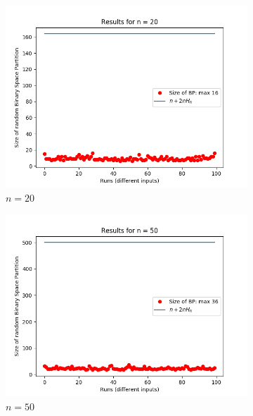 \documentclass[letterpaper]{article}
\begin{document}
\begin{figure}[H]
    \begin{subfigure}{.33\textwidth}
      \centering
      \includegraphics[width=1\linewidth]{images/assign1/fulltriangle/inputs_20}
      \caption{$n = 20$}
    \end{subfigure}
    \begin{subfigure}{.33\textwidth}
      \centering
      \includegraphics[width=1\linewidth]{images/assign1/fulltriangle/inputs_50}
      \caption{$n = 50$}
    \end{subfigure}
    \begin{subfigure}{.33\textwidth}
      \centering

\end{subfigure}
\end{figure}
\end{document}
